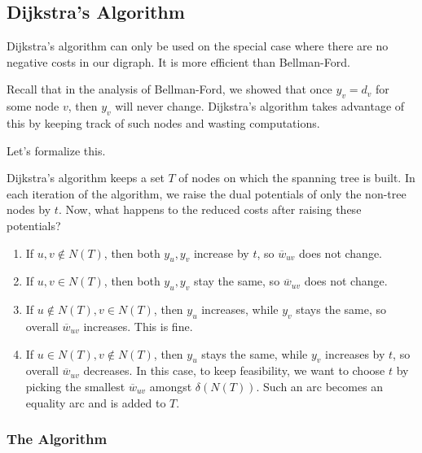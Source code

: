 \subsection{Dijkstra's Algorithm}
Dijkstra's algorithm can only be used on the special case where there are no negative costs in our digraph. It is more efficient than Bellman-Ford.

Recall that in the analysis of Bellman-Ford, we showed that once $y_v = d_v$ for some node $v$, then $y_v$ will never change.
Dijkstra's algorithm takes advantage of this by keeping track of such nodes and wasting computations.

Let's formalize this.

Dijkstra's algorithm keeps a set $T$ of nodes on which the spanning tree is built.
In each iteration of the algorithm, we raise the dual potentials of only the non-tree nodes by $t$.
Now, what happens to the reduced costs after raising these potentials?
\begin{enumerate}
    \item If $u,v \not\in N(T)$, then both $y_u, y_v$ increase by $t$, so $\overline{w}_{uv}$ does not change.
    \item If $u,v \in N(T)$, then both $y_u, y_v$ stay the same, so $\overline{w}_{uv}$ does not change.
    \item If $u \not\in N(T), v \in N(T)$, then $y_u$ increases, while $y_v$ stays the same, so overall $\overline{w}_{uv}$ increases. This is fine.
    \item If $u \in N(T), v \not\in N(T)$, then $y_u$ stays the same, while $y_v$ increases by $t$, so overall $ \overline{w}_{uv}$ decreases. In this case, to keep feasibility, we want to choose $t$ by picking the smallest $\overline{w}_{uv}$ amongst $\delta(N(T))$. Such an arc becomes an equality arc and is added to $T$.
\end{enumerate}

\subsubsection{The Algorithm}

